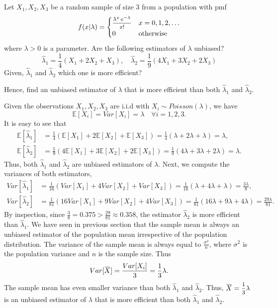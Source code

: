 \begin{example}
    Let $X_1, X_2, X_3$ be a random sample of size 3 from a population with pmf 
    \[
        f(x|\lambda) = \begin{cases}
            \mfrac{\lambda^x\, e^{-\lambda}}{x!} & x = 0, 1, 2, \ldots\\
            0 & \text{otherwise}
        \end{cases}
    \]
    where $\lambda > 0$ is a parameter. Are the following estimators of $\lambda$ unbiased?
    \[
        \hat{\lambda}_1 = \frac{1}{4}(X_1 + 2X_2 + X_3), \quad \hat{\lambda}_2 = \frac{1}{9}(4X_1 + 3X_2 + 2X_3) 
    \]
    Given, $\hat{\lambda}_1$ and $\hat{\lambda}_2$ which one is more efficient? 
    
    Hence, find an unbiased estimator of $\lambda$ that is more efficient than both $\hat{\lambda}_1$ and $\hat{\lambda}_2$.
\end{example}
\begin{solution}
    Given the observations $X_1, X_2, X_3$ are i.i.d with $X_i \sim Poisson(\lambda)$, we have
    \[
        \mathbb{E}[X_i] = Var[X_i] = \lambda \quad \forall i = 1,2,3.
    \]
    It is easy to see that 
    \begin{align*}
        \mathbb{E}[\hat{\lambda}_1] &= \frac{1}{4}(\mathbb{E}[X_1] + 2\mathbb{E}[X_2] + \mathbb{E}[X_3]) = \frac{1}{4}(\lambda + 2\lambda + \lambda) = \lambda,\\
        \mathbb{E}[\hat{\lambda}_2] &= \frac{1}{9}(4\mathbb{E}[X_1] + 3\mathbb{E}[X_2] + 2\mathbb{E}[X_3]) = \frac{1}{9}(4\lambda + 3\lambda + 2\lambda) = \lambda.
    \end{align*}
    Thus, both $\hat{\lambda}_1$ and $\hat{\lambda}_2$ are unbiased estimators of $\lambda$.
    Next, we compute the variances of both estimators,
    \begin{align*}
        Var[\hat{\lambda}_1] &= \frac{1}{16}(Var[X_1] + 4Var[X_2] + Var[X_3]) = \frac{1}{16}(\lambda + 4\lambda + \lambda) = \frac{3\lambda}{8},\\
        Var[\hat{\lambda}_2] &= \frac{1}{81}(16Var[X_1] + 9Var[X_2] + 4Var[X_3]) = \frac{1}{81}(16\lambda + 9\lambda + 4\lambda) = \frac{29\lambda}{81}.
    \end{align*}
    By inspection, since $\frac{3}{8} = 0.375 > \frac{29}{81} \approx 0.358$, the estimator $\hat{\lambda}_2$ is more efficient than $\hat{\lambda}_1$.
    We have seen in previous section that the sample mean is always an unbiased estimator of the population mean irrespective of the population distribution. 
    The variance of the sample mean is always equal to $\frac{\sigma^2}{n}$, where $\sigma^2$ is the population variance and $n$ is the sample size. Thus 
    \[
        Var[\ols{X}] = \frac{Var[X_i]}{3} = \frac{1}{3}\lambda.
    \]
    The sample mean has even smaller variance than both $\hat{\lambda}_1$ and $\hat{\lambda}_2$. Thus, $\ols{X} = \mfrac{1}{3}\lambda$ is an unbiased estimator of $\lambda$ that is more efficient than both $\hat{\lambda}_1$ and $\hat{\lambda}_2$.
\end{solution}

